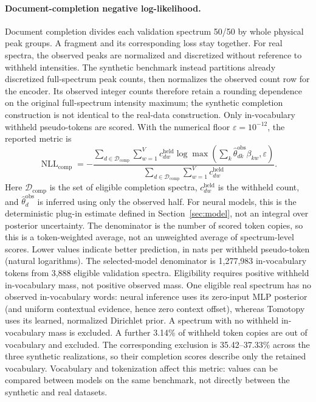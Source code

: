 \documentclass[10pt,a4paper]{article}
\begin{document}
\paragraph{Document-completion negative log-likelihood.}
Document completion divides each validation spectrum 50/50 by whole physical
peak groups. A fragment and its corresponding loss stay together. For real
spectra, the observed peaks are normalized and discretized without reference
to withheld intensities. The synthetic benchmark instead partitions already
discretized full-spectrum peak counts, then normalizes the observed count row
for the encoder. Its observed integer counts therefore retain a rounding
dependence on the original full-spectrum intensity maximum; the synthetic
completion construction is not identical to the real-data construction.
Only in-vocabulary withheld pseudo-tokens are scored. With the numerical
floor $\varepsilon=10^{-12}$, the reported metric is
\begin{equation}
 \operatorname{NLL}_{\mathrm{comp}}
 =-\frac{\sum_{d\in\mathcal D_{\mathrm{comp}}}\sum_{w=1}^{V}c^{\mathrm{held}}_{dw}
    \log\max\left(\sum_k\widehat\theta^{\mathrm{obs}}_{dk}\beta_{kw},
                     \varepsilon\right)}
   {\sum_{d\in\mathcal D_{\mathrm{comp}}}\sum_{w=1}^{V}c^{\mathrm{held}}_{dw}}.
 \label{eq:completion}
\end{equation}
Here $\mathcal D_{\mathrm{comp}}$ is the set of eligible completion spectra,
$c^{\mathrm{held}}_{dw}$ is the withheld count, and
$\widehat\theta^{\mathrm{obs}}_d$ is inferred using only the observed half.
For neural models, this is the deterministic plug-in estimate defined in
Section~\ref{sec:model}, not an integral over posterior uncertainty.
The denominator is the number of scored token copies, so this is a
token-weighted average, not an unweighted average of spectrum-level scores.
Lower values indicate better prediction, in nats per withheld pseudo-token
(natural logarithms).
The selected-model denominator is 1,277,983 in-vocabulary tokens from 3,888
eligible validation spectra. Eligibility requires positive withheld
in-vocabulary mass, not positive observed mass. One eligible real spectrum
has no observed in-vocabulary words: neural inference uses its zero-input
MLP posterior (and uniform contextual evidence, hence zero context offset),
whereas Tomotopy uses its learned, normalized Dirichlet prior. A spectrum
with no withheld in-vocabulary mass is excluded. A further 3.14\% of withheld token copies are
out of vocabulary and excluded.
The corresponding exclusion is 35.42--37.33\% across the three synthetic
realizations, so their completion scores describe only the retained vocabulary.
Vocabulary and tokenization affect this metric: values can be compared
between models on the same benchmark, not directly between the synthetic
and real datasets.
\end{document}
